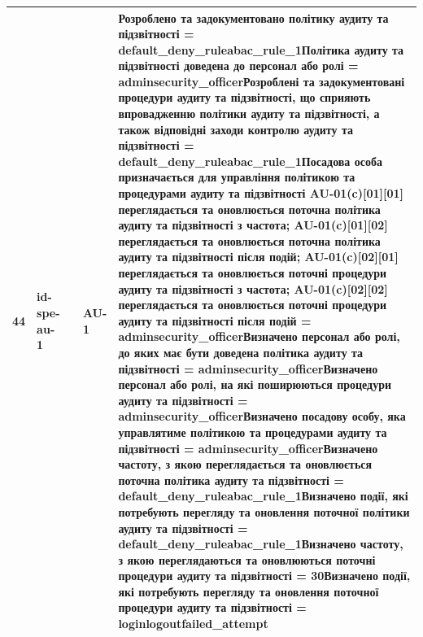 \documentclass[10pt]{article}
\begin{document}
\begin{longtable}{|c|>{\raggedright\arraybackslash}p{4cm}|>{\raggedright\arraybackslash}p{2.5cm}|>{\raggedright\arraybackslash}p{3.5cm}|>{\raggedright\arraybackslash}p{5.5cm}|}
44 & id-spe-au-1 &  & AU-1 & Розроблено та задокументовано політику аудиту та підзвітності = \textbf{default\_\allowbreak{}deny\_\allowbreak{}ruleabac\_\allowbreak{}rule\_\allowbreak{}1}\newline Політика аудиту та підзвітності доведена до персонал або ролі = \textbf{adminsecurity\_\allowbreak{}officer}\newline Розроблені та задокументовані процедури аудиту та підзвітності, що сприяють впровадженню політики аудиту та підзвітності, а також відповідні заходи контролю аудиту та підзвітності = \textbf{default\_\allowbreak{}deny\_\allowbreak{}ruleabac\_\allowbreak{}rule\_\allowbreak{}1}\newline Посадова особа призначається для управління політикою та процедурами аудиту та підзвітності AU-01(c)[01][01] переглядається та оновлюється поточна політика аудиту та підзвітності з частота; AU-01(c)[01][02] переглядається та оновлюється поточна політика аудиту та підзвітності після подій; AU-01(c)[02][01] переглядається та оновлюється поточні процедури аудиту та підзвітності з частота; AU-01(c)[02][02] переглядається та оновлюється поточні процедури аудиту та підзвітності після подій = \textbf{adminsecurity\_\allowbreak{}officer}\newline Визначено персонал або ролі, до яких має бути доведена політика аудиту та підзвітності = \textbf{adminsecurity\_\allowbreak{}officer}\newline Визначено персонал або ролі, на які поширюються процедури аудиту та підзвітності = \textbf{adminsecurity\_\allowbreak{}officer}\newline Визначено посадову особу, яка управлятиме політикою та процедурами аудиту та підзвітності = \textbf{adminsecurity\_\allowbreak{}officer}\newline Визначено частоту, з якою переглядається та оновлюється поточна політика аудиту та підзвітності = \textbf{default\_\allowbreak{}deny\_\allowbreak{}ruleabac\_\allowbreak{}rule\_\allowbreak{}1}\newline Визначено події, які потребують перегляду та оновлення поточної політики аудиту та підзвітності = \textbf{default\_\allowbreak{}deny\_\allowbreak{}ruleabac\_\allowbreak{}rule\_\allowbreak{}1}\newline Визначено частоту, з якою переглядаються та оновлюються поточні процедури аудиту та підзвітності = \textbf{30}\newline Визначено події, які потребують перегляду та оновлення поточної процедури аудиту та підзвітності = \textbf{loginlogoutfailed\_\allowbreak{}attempt} \\ \hline

\end{longtable}
\end{document}
